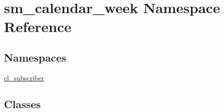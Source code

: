 \hypertarget{namespacesm__calendar__week}{}\section{sm\+\_\+calendar\+\_\+week Namespace Reference}
\label{namespacesm__calendar__week}
\subsection*{Namespaces}
\begin{DoxyCompactItemize}
\item 
 \hyperlink{namespacesm__calendar__week_1_1cl__subscriber}{cl\+\_\+subscriber}
\end{DoxyCompactItemize}
\subsection*{Classes}
